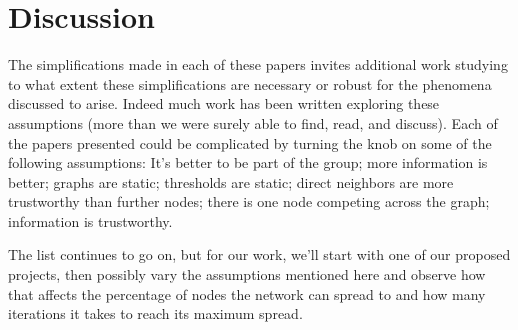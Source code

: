 \section{Discussion}
The simplifications made in each of these papers invites additional work studying to what extent these simplifications are necessary or robust for the phenomena discussed to arise. Indeed much work has been written exploring these assumptions (more than we were surely able to find, read, and discuss). Each of the papers presented could be complicated by turning the knob on some of the following assumptions: It’s better to be part of the group; more information is better; graphs are static; thresholds are static; direct neighbors are more trustworthy than further nodes; there is one node competing across the graph; information is trustworthy.

The list continues to go on, but for our work, we'll start with one of our proposed projects, then possibly vary the assumptions mentioned here and observe how that affects the percentage of nodes the network can spread to and how many iterations it takes to reach its maximum spread.



\printbibliography